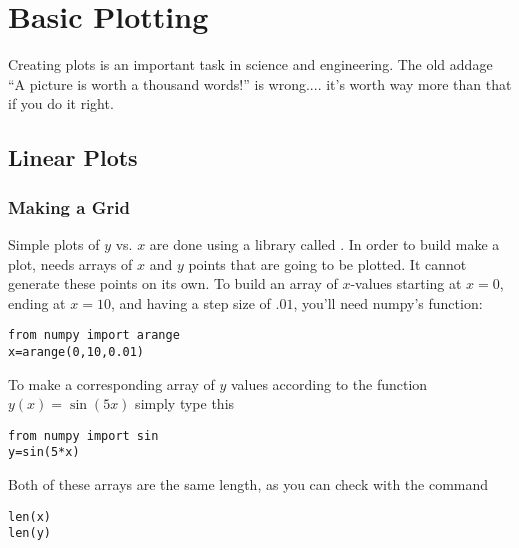 \chapter{Basic Plotting}
\label{chap:1DPlots}

Creating plots is an important task in science and engineering.  The
old addage ``A picture is worth a thousand words!'' is wrong.... it's
worth way more than that if you do it right.
\medskip

\section{Linear Plots}

\subsection*{Making a Grid}
 Simple plots of $y$ vs. $x$ are done using a
library called .  In order to build make a plot,  needs arrays of $x$ and $y$ points that are going to be plotted.  It cannot generate these points on its own.
To build an array  of $x$-values
starting at $x=0$, ending at $x=10$, and having a step size of
$.01$, you'll need numpy's  function:
\begin{Verbatim}
from numpy import arange
x=arange(0,10,0.01)
\end{Verbatim}
To make a corresponding array of $y$ values according to the
function $y(x)=\sin(5x)$ simply type this
\begin{Verbatim}
from numpy import sin
y=sin(5*x)
\end{Verbatim}
Both of these arrays are the same length, as you can check with the
 command
\begin{Verbatim}
len(x)
len(y)
\end{Verbatim}

